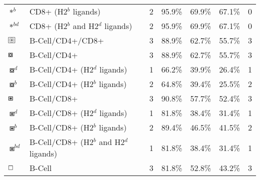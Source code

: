 \begin{tabular}{llccccc}
                                          $ \ast^b $ &                    CD8+ (H2$^b$ ligands) &            2 &         95.9\% &          69.9\% &         67.1\% &                          0 \\
                                       $ \ast^{bd} $ &         CD8+ (H2$^b$ and H2$^d$ ligands) &            2 &         95.9\% &          69.9\% &         67.1\% &                          0 \\
 $ \setlength{\fboxsep}{0.5pt} \boxed{\circledast} $ &                         B-Cell/CD4+/CD8+ &            3 &         88.9\% &          62.7\% &         55.7\% &                          3 \\
                                      $ \boxcircle $ &                              B-Cell/CD4+ &            3 &         88.9\% &          62.7\% &         55.7\% &                          3 \\
                                    $ \boxcircle^d $ &             B-Cell/CD4+ (H2$^d$ ligands) &            1 &         66.2\% &          39.9\% &         26.4\% &                          1 \\
                                    $ \boxcircle^b $ &             B-Cell/CD4+ (H2$^b$ ligands) &            2 &         64.8\% &          39.4\% &         25.5\% &                          2 \\
                                         $ \boxast $ &                              B-Cell/CD8+ &            3 &         90.8\% &          57.7\% &         52.4\% &                          3 \\
                                       $ \boxast^d $ &             B-Cell/CD8+ (H2$^d$ ligands) &            1 &         81.8\% &          38.4\% &         31.4\% &                          1 \\
                                       $ \boxast^b $ &             B-Cell/CD8+ (H2$^b$ ligands) &            2 &         89.4\% &          46.5\% &         41.5\% &                          2 \\
                                    $ \boxast^{bd} $ &  B-Cell/CD8+ (H2$^b$ and H2$^d$ ligands) &            1 &         81.8\% &          38.4\% &         31.4\% &                          1 \\
                                       $ \boxempty $ &                                   B-Cell &            3 &         81.8\% &          52.8\% &         43.2\% &                          3 \\
\bottomrule
\end{tabular}
